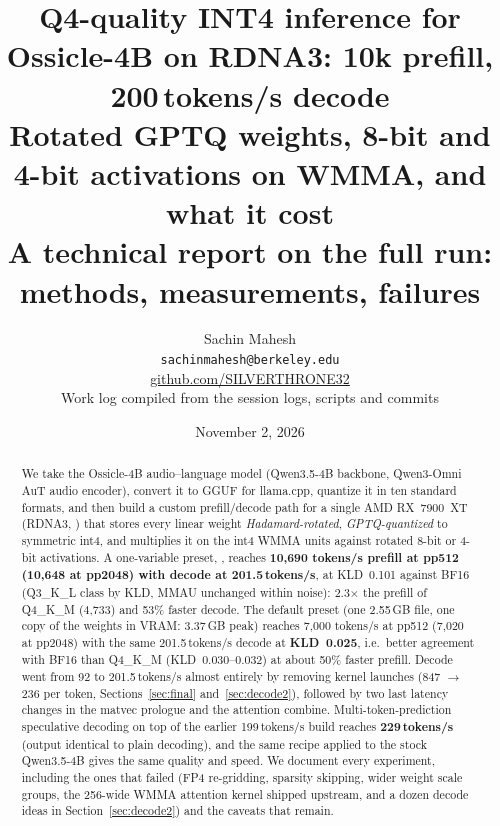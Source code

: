 \documentclass[10pt,a4paper]{article}
\title{\textbf{Q4-quality INT4 inference for Ossicle-4B on RDNA3: 10k prefill, 200\,tokens/s decode}\\[2pt]
\large Rotated GPTQ weights, 8-bit and 4-bit activations on WMMA, and what it cost\\[-2pt]
\normalsize A technical report on the full run: methods, measurements, failures}
\author{Sachin Mahesh\\ \texttt{sachinmahesh@berkeley.edu}\\ \href{https://github.com/SILVERTHRONE32}{github.com/SILVERTHRONE32}\\[3pt]\small Work log compiled from the session logs, scripts and commits}
\date{November 2, 2026}
\newcommand{\tx}[1]{\texttt{\detokenize{#1}}}
\begin{document}
\maketitle
\thispagestyle{empty}

\begin{abstract}
\noindent
We take the Ossicle-4B audio--language model (Qwen3.5-4B backbone, Qwen3-Omni AuT audio encoder), convert it to GGUF for
llama.cpp, quantize it in ten standard formats, and then build a custom prefill/decode path for a single AMD RX~7900~XT
(RDNA3, \tx{gfx1100}) that stores every linear weight \emph{Hadamard-rotated}, \emph{GPTQ-quantized} to symmetric int4, and
multiplies it on the int4 WMMA units against rotated 8-bit or 4-bit activations.
A one-variable preset, \tx{GGML_INT4_PREFILL=fast}, reaches \textbf{10{,}690 tokens/s prefill at pp512 (10{,}648 at pp2048) with decode at
201.5\,tokens/s}, at KLD~0.101 against BF16 (Q3\_K\_L class by KLD, MMAU unchanged within noise): 2.3$\times$ the prefill of Q4\_K\_M (4{,}733) and 53\% faster decode.
The default \tx{quality} preset (one 2.55\,GB file, one copy of the weights in VRAM: 3.37\,GB peak) reaches 7{,}000 tokens/s at pp512 (7{,}020 at pp2048) with the same
201.5\,tokens/s decode at \textbf{KLD~0.025}, i.e.\ better agreement with BF16 than Q4\_K\_M (KLD~0.030--0.032) at about 50\% faster prefill.
Decode went from 92 to 201.5\,tokens/s almost entirely by removing kernel launches (847 $\to$ 236 per token, Sections~\ref{sec:final} and~\ref{sec:decode2}), followed
by two last latency changes in the matvec prologue and the attention combine. Multi-token-prediction speculative decoding on top of the
earlier 199\,tokens/s build reaches \textbf{229\,tokens/s} (output identical to plain decoding), and the same recipe applied to the stock Qwen3.5-4B gives
the same quality and speed.
We document every experiment, including the ones that failed (FP4 re-gridding, sparsity skipping, wider weight scale groups, the
256-wide WMMA attention kernel shipped upstream, and a dozen decode ideas in Section~\ref{sec:decode2}) and the caveats that remain.
\end{abstract}
\end{document}
